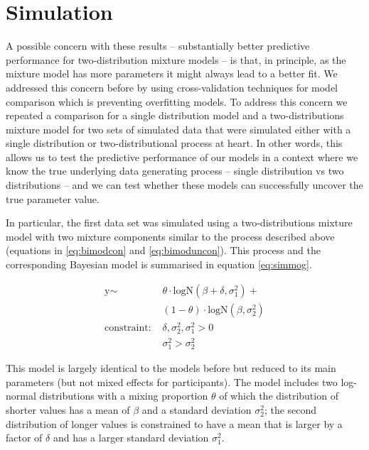 \documentclass[
  man,floatsintext]{apa7}
\begin{document}
\begin{center}
\begin{ThreePartTable}
{}

\end{ThreePartTable}
\end{center}

\newpage

\hypertarget{simulation}{%
\section{Simulation}\label{simulation}}

A possible concern with these results -- substantially better predictive performance for two-distribution mixture models -- is that, in principle, as the mixture model has more parameters it might always lead to a better fit. We addressed this concern before by using cross-validation techniques for model comparison which is preventing overfitting models. To address this concern we repeated a comparison for a single distribution model and a two-distributions mixture model for two sets of simulated data that were simulated either with a single distribution or two-distributional process at heart. In other words, this allows us to test the predictive performance of our models in a context where we know the true underlying data generating process -- single distribution vs two distributions -- and we can test whether these models can successfully uncover the true parameter value.

In particular, the first data set was simulated using a two-distributions mixture model with two mixture components similar to the process described above (equations in \ref{eq:bimodcon} and \ref{eq:bimoduncon}). This process and the corresponding Bayesian model is summarised in equation \ref{eq:simmog}.

\begin{equation}
\begin{aligned}
\label{eq:simmog}
\text{y} \sim\text{ } & \theta \cdot \text{logN}(\beta + \delta, \sigma^2_1) +\\
& (1 - \theta) \cdot \text{logN}(\beta, \sigma^2_2)\\
\text{constraint: } & \delta, \sigma_\text{2}^2, \sigma_\text{1}^2>0\\
        & \sigma_{1}^2 > \sigma_{2}^2
\end{aligned}
\end{equation}

This model is largely identical to the models before but reduced to its main parameters (but not mixed effects for participants). The model includes two log-normal distributions with a mixing proportion \(\theta\) of which the distribution of shorter values has a mean of \(\beta\) and a standard deviation \(\sigma^2_2\); the second distribution of longer values is constrained to have a mean that is larger by a factor of \(\delta\) and has a larger standard deviation \(\sigma^2_1\).
\end{document}
